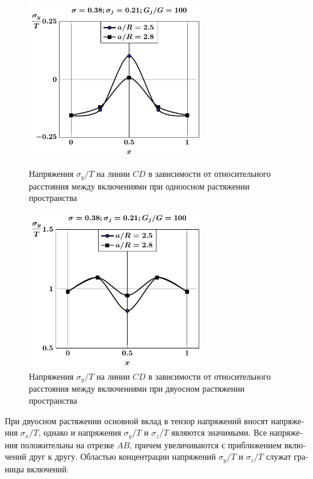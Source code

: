\begin{russian}
\begin{figure}[h!]
\centering\footnotesize
\parbox[b]{7.5cm}{\centering\includegraphics[width=7.5cm]{inc13-a-d95-g100-t1-sig_y-cd.pdf}
\caption{Напряжения $\sigma_y/T$ на линии  $CD$ в зависимости от относительного расстояния между включениями при одноосном растяжении пространства
\label{f:8:80}}}\hfil\hfil
\parbox[b]{7.5cm}{\centering\includegraphics[width=7.5cm]{inc13-a-d95-g100-t2-sig_y-cd.pdf}
\caption{Напряжения $\sigma_y/T$ на линии  $CD$ в зависимости от относительного расстояния между включениями при двуосном растяжении пространства
\label{f:8:81}}}
\end{figure}

При двуосном растяжении основной вклад в тензор напряжений вносят напряжения $\sigma_x/T$, однако и напряжения $\sigma_y/T$ и $\sigma_z/T$ являются значимыми. Все напряжения положительны на отрезке $AB$, причем увеличиваются с приближением включений друг к другу. Областью концентрации напряжений $\sigma_y/T$ и $\sigma_z/T$ служат границы включений.


\end{russian}
